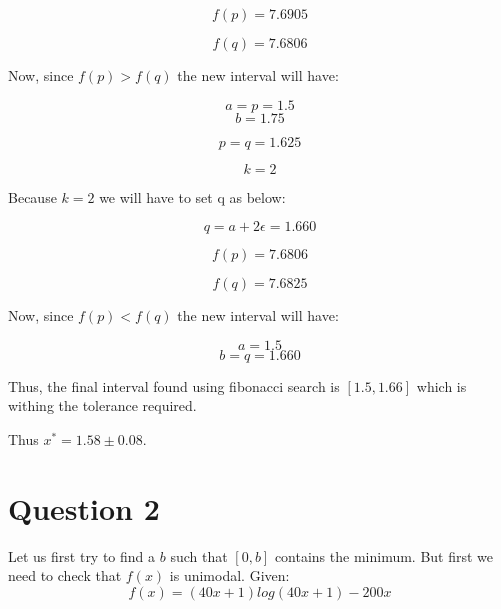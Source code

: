 \documentclass[a4paper]{article}
\begin{document}
\begin{equation}
f(p) = 7.6905   
\end{equation}   

\begin{equation}
f(q) =  7.6806
\end{equation}

Now, since $f(p) > f(q)$ the new interval will have:

\begin{equation}
a = p = 1.5
\end{equation}
\begin{equation}
b = 1.75
\end{equation}

\begin{equation}
p  = q = 1.625
\end{equation}


\begin{equation}
k = 2
\end{equation}

Because $k = 2$ we will have to set q as below:

\begin{equation}
q = a + 2\epsilon = 1.660
\end{equation}

\begin{equation}
f(p) = 7.6806    
\end{equation}

\begin{equation}
f(q) = 7.6825
\end{equation}

Now, since $f(p) < f(q)$ the new interval will have:

\begin{equation}
a = 1.5
\end{equation}
\begin{equation}
b = q = 1.660
\end{equation}

Thus, the final interval found using fibonacci search is $[1.5, 1.66]$ which is withing the tolerance required. 

Thus $x^* = 1.58 \pm 0.08$.

\section*{Question 2}

Let us first try to find a $b$ such that $[0, b]$ contains the minimum. But first we need to check that $f(x)$ is unimodal.
Given:
\begin{equation}
f(x) = (40x+1) log(40x+1)−200x
\end{equation}
\end{document}
